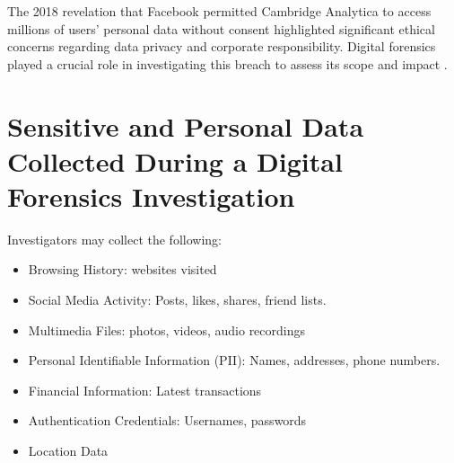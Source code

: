 \documentclass[12pt]{article}
\begin{document}
The 2018 revelation that Facebook permitted Cambridge Analytica to access millions of users’ personal data without consent highlighted significant ethical concerns regarding data privacy and corporate responsibility. Digital forensics played a crucial role in investigating this breach to assess its scope and impact \cite{cadwalladr2018facebook}.

\section{Sensitive and Personal Data Collected During a Digital Forensics Investigation}
Investigators may collect the following:
\begin{itemize}
    \item Browsing History: websites visited
    \item Social Media Activity: Posts, likes, shares, friend lists.
    \item Multimedia Files: photos, videos, audio recordings
    \item Personal Identifiable Information (PII): Names, addresses, phone numbers.
    \item Financial Information: Latest transactions
    \item Authentication Credentials: Usernames, passwords
    \item Location Data
\end{itemize}
\end{document}
